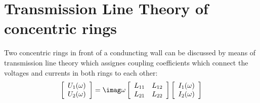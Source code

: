 \section{Transmission Line Theory of concentric rings}
Two concentric rings in front of a conduncting wall can be discussed
by means of transmission line theory which assignes coupling coefficients
which connect the voltages and currents in both rings to each other:
\begin{equation}
\left[
\begin{array}{c}
U_1(\omega) \\ U_2(\omega)
\end{array}
\right] = \imag \omega\left[
\begin{array}{cc}
L_{11} & L_{12} \\
L_{21} & L_{22}
\end{array}
\right]
\left[
\begin{array}{c}
I_1(\omega) \\ I_2(\omega)
\end{array}
\right] 
\end{equation}
